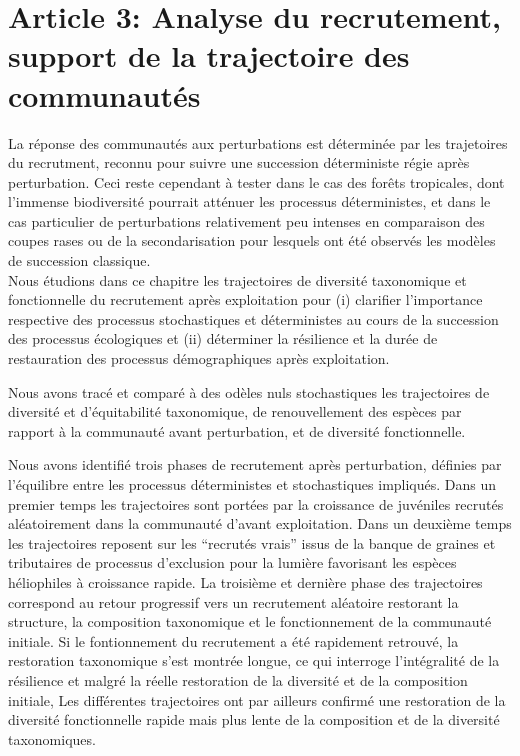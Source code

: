 \documentclass[
  11pt,
  french,
  A4paper,
  extrafontsizes,onecolumn,openright
  ]{memoir}
\begin{document}
\chapter{Article 3: Analyse du recrutement, support de la trajectoire
des
communautés}\label{article-3-analyse-du-recrutement-support-de-la-trajectoire-des-communautes}

La réponse des communautés aux perturbations est déterminée par les
trajetoires du recrutment, reconnu pour suivre une succession
déterministe régie après perturbation. Ceci reste cependant à tester
dans le cas des forêts tropicales, dont l'immense biodiversité pourrait
atténuer les processus déterministes, et dans le cas particulier de
perturbations relativement peu intenses en comparaison des coupes rases
ou de la secondarisation pour lesquels ont été observés les modèles de
succession classique.\\
Nous étudions dans ce chapitre les trajectoires de diversité taxonomique
et fonctionnelle du recrutement après exploitation pour (i) clarifier
l'importance respective des processus stochastiques et déterministes au
cours de la succession des processus écologiques et (ii) déterminer la
résilience et la durée de restauration des processus démographiques
après exploitation.

Nous avons tracé et comparé à des odèles nuls stochastiques les
trajectoires de diversité et d'équitabilité taxonomique, de
renouvellement des espèces par rapport à la communauté avant
perturbation, et de diversité fonctionnelle.

Nous avons identifié trois phases de recrutement après perturbation,
définies par l'équilibre entre les processus déterministes et
stochastiques impliqués. Dans un premier temps les trajectoires sont
portées par la croissance de juvéniles recrutés aléatoirement dans la
communauté d'avant exploitation. Dans un deuxième temps les trajectoires
reposent sur les ``recrutés vrais'' issus de la banque de graines et
tributaires de processus d'exclusion pour la lumière favorisant les
espèces héliophiles à croissance rapide. La troisième et dernière phase
des trajectoires correspond au retour progressif vers un recrutement
aléatoire restorant la structure, la composition taxonomique et le
fonctionnement de la communauté initiale. Si le fontionnement du
recrutement a été rapidement retrouvé, la restoration taxonomique s'est
montrée longue, ce qui interroge l'intégralité de la résilience et
malgré la réelle restoration de la diversité et de la composition
initiale, Les différentes trajectoires ont par ailleurs confirmé une
restoration de la diversité fonctionnelle rapide mais plus lente de la
composition et de la diversité taxonomiques.
\end{document}
